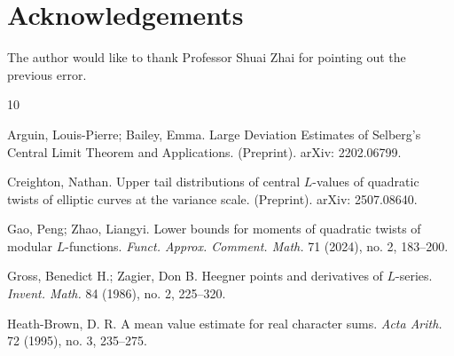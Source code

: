 \documentclass[12pt,reqno]{amsart}
\numberwithin{equation}{section}
\theoremstyle{plain}
\theoremstyle{definition}
\theoremstyle{remark}
\begin{document}
\section*{Acknowledgements}

The author would like to thank Professor Shuai Zhai for pointing out the previous error.


\begin{thebibliography}{10}

Arguin, Louis-Pierre; Bailey, Emma.
Large Deviation Estimates of Selberg's Central Limit Theorem and Applications.
(Preprint).
arXiv: 2202.06799.

Creighton, Nathan.
Upper tail distributions of central $L$-values of quadratic twists of elliptic curves at the variance scale.
(Preprint).
arXiv: 2507.08640.

Gao, Peng; Zhao, Liangyi.
Lower bounds for moments of quadratic twists of modular $L$-functions.
\emph{Funct. Approx. Comment. Math.} 71 (2024), no. 2, 183--200.




Gross, Benedict H.; Zagier, Don B. Heegner points and derivatives of $L$-series.
\emph{Invent. Math.} 84 (1986), no. 2, 225--320.


Heath-Brown, D. R.
A mean value estimate for real character sums.
\emph{Acta Arith.} 72 (1995), no. 3, 235--275.









\end{thebibliography}
\end{document}
